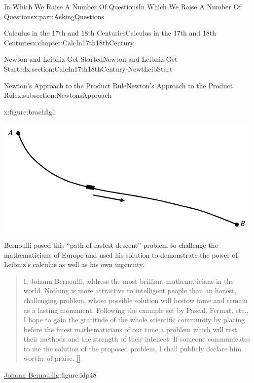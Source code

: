 \documentclass[oneside,10pt,]{book}
\newcommand{\xreffont}{\relax}
\numberwithin{equation}{section}
\begin{document}
\begin{partptx}{In Which We Raise A Number Of Questions}{}{In Which We Raise A Number Of Questions}{}{}{x:part:AskingQuestions}
\begin{chapterptx}{Calculus in the 17th and 18th Centuries}{}{Calculus in the 17th and 18th Centuries}{}{}{x:chapter:CalcIn17th18thCentury}
\begin{sectionptx}{Newton and Leibniz Get Started}{}{Newton and Leibniz Get Started}{}{}{x:section:CalcIn17th18thCentury-NewtLeibStart}
\begin{subsectionptx}{Newton's Approach to the Product Rule}{}{Newton's Approach to the Product Rule}{}{}{x:subsection:NewtonsApproach}
\begin{figureptx}{}{x:figure:brachfig1}{}
\begin{image}{0.125}{0.75}{0.125}
\includegraphics[width=\linewidth]{images/brachfig1.png}
\end{image}%
\tcblower
\end{figureptx}%
Bernoulli posed this ``path of fastest descent'' problem to challenge the mathematicians of Europe and used his solution to demonstrate the power of Leibniz's calculus as well as his own ingenuity.  %
\begin{quote}%
I, Johann Bernoulli, address the most brilliant mathematicians in the world. Nothing is more attractive to intelligent people than an honest, challenging problem, whose possible solution will bestow fame and remain as a lasting monument. Following the example set by Pascal, Fermat, etc., I hope to gain the gratitude of the whole scientific community by placing before the finest mathematicians of our time a problem which will test their methods and the strength of their intellect. If someone communicates to me the solution of the proposed problem, I shall publicly declare him worthy of praise. \hyperlink{x:biblio:Bernoulli_bio_mactutor}{[{\xreffont 11}]}%
\end{quote}
\begin{figureptx}{\href{https://mathshistory.st-andrews.ac.uk/Biographies/Bernoulli_Johann/}{Johann Bernoulli}\protect\footnotemark{}}{g:figure:idp48}{}%
%
\begin{image}{0.325}{0.35}{0.325}%

\end{image}
\end{figureptx}
\end{subsectionptx}
\end{sectionptx}
\end{chapterptx}
\end{partptx}
\end{document}
